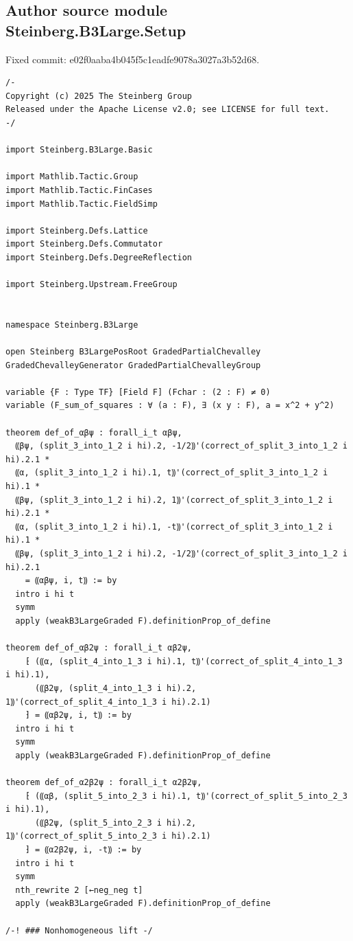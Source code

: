 \subsection*{Author source module Steinberg.B3Large.Setup}
\noindent Fixed commit: e02f0aaba4b045f5c1eadfe9078a3027a3b52d68.
\begin{Verbatim}
/-
Copyright (c) 2025 The Steinberg Group
Released under the Apache License v2.0; see LICENSE for full text.
-/

import Steinberg.B3Large.Basic

import Mathlib.Tactic.Group
import Mathlib.Tactic.FinCases
import Mathlib.Tactic.FieldSimp

import Steinberg.Defs.Lattice
import Steinberg.Defs.Commutator
import Steinberg.Defs.DegreeReflection

import Steinberg.Upstream.FreeGroup


namespace Steinberg.B3Large

open Steinberg B3LargePosRoot GradedPartialChevalley GradedChevalleyGenerator GradedPartialChevalleyGroup

variable {F : Type TF} [Field F] (Fchar : (2 : F) ≠ 0)
variable (F_sum_of_squares : ∀ (a : F), ∃ (x y : F), a = x^2 + y^2)

theorem def_of_αβψ : forall_i_t αβψ,
  ⸨βψ, (split_3_into_1_2 i hi).2, -1/2⸩'(correct_of_split_3_into_1_2 i hi).2.1 *
  ⸨α, (split_3_into_1_2 i hi).1, t⸩'(correct_of_split_3_into_1_2 i hi).1 *
  ⸨βψ, (split_3_into_1_2 i hi).2, 1⸩'(correct_of_split_3_into_1_2 i hi).2.1 *
  ⸨α, (split_3_into_1_2 i hi).1, -t⸩'(correct_of_split_3_into_1_2 i hi).1 *
  ⸨βψ, (split_3_into_1_2 i hi).2, -1/2⸩'(correct_of_split_3_into_1_2 i hi).2.1
    = ⸨αβψ, i, t⸩ := by
  intro i hi t
  symm
  apply (weakB3LargeGraded F).definitionProp_of_define

theorem def_of_αβ2ψ : forall_i_t αβ2ψ,
    ⁅ (⸨α, (split_4_into_1_3 i hi).1, t⸩'(correct_of_split_4_into_1_3 i hi).1),
      (⸨β2ψ, (split_4_into_1_3 i hi).2, 1⸩'(correct_of_split_4_into_1_3 i hi).2.1)
    ⁆ = ⸨αβ2ψ, i, t⸩ := by
  intro i hi t
  symm
  apply (weakB3LargeGraded F).definitionProp_of_define

theorem def_of_α2β2ψ : forall_i_t α2β2ψ,
    ⁅ (⸨αβ, (split_5_into_2_3 i hi).1, t⸩'(correct_of_split_5_into_2_3 i hi).1),
      (⸨β2ψ, (split_5_into_2_3 i hi).2, 1⸩'(correct_of_split_5_into_2_3 i hi).2.1)
    ⁆ = ⸨α2β2ψ, i, -t⸩ := by
  intro i hi t
  symm
  nth_rewrite 2 [←neg_neg t]
  apply (weakB3LargeGraded F).definitionProp_of_define

/-! ### Nonhomogeneous lift -/


\end{Verbatim}
